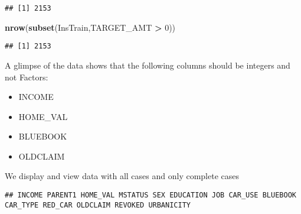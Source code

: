 \documentclass[]{article}
\newenvironment{Shaded}{\begin{snugshade}}{\end{snugshade}}
\newcommand{\DecValTok}[1]{\textcolor[rgb]{0.00,0.00,0.81}{#1}}
\newcommand{\KeywordTok}[1]{\textcolor[rgb]{0.13,0.29,0.53}{\textbf{#1}}}
\newcommand{\NormalTok}[1]{#1}
\newcommand{\OperatorTok}[1]{\textcolor[rgb]{0.81,0.36,0.00}{\textbf{#1}}}
\newcommand{\StringTok}[1]{\textcolor[rgb]{0.31,0.60,0.02}{#1}}
\providecommand{\tightlist}{%
  \setlength{\itemsep}{0pt}\setlength{\parskip}{0pt}}
\begin{document}
\begin{verbatim}
## [1] 2153
\end{verbatim}

\begin{Shaded}
\begin{Highlighting}[]
\KeywordTok{nrow}\NormalTok{(}\KeywordTok{subset}\NormalTok{(InsTrain,TARGET_AMT }\OperatorTok{>}\StringTok{ }\DecValTok{0}\NormalTok{))}
\end{Highlighting}
\end{Shaded}

\begin{verbatim}
## [1] 2153
\end{verbatim}

A glimpse of the data shows that the following columns should be
integers and not Factors:

\begin{itemize}
\tightlist
\item
  INCOME
\item
  HOME\_VAL
\item
  BLUEBOOK
\item
  OLDCLAIM
\end{itemize}

We display and view data with all cases and only complete cases

\begin{verbatim}
## INCOME PARENT1 HOME_VAL MSTATUS SEX EDUCATION JOB CAR_USE BLUEBOOK CAR_TYPE RED_CAR OLDCLAIM REVOKED URBANICITY
\end{verbatim}
\end{document}
